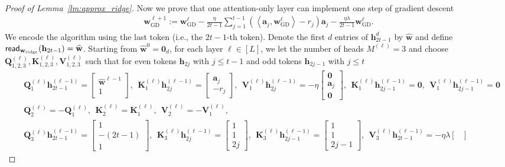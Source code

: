 \documentclass[10pt]{article}
\renewcommand{\hat}{\widehat}
\newcommand{\<}{\left\langle}
\renewcommand{\>}{\right\rangle}
\renewcommand{\bQ}{\mathbf{Q}}
\newcommand{\bzero}{{\mathbf 0}}
\renewcommand{\read}{{\sf read}}
\newcommand{\ridge}{{\rm ridge}}
\newcommand{\GD}{{\mathrm{GD}}}
\newcommand{\partd}{{d}}
\newcommand{\ssl}{{{\ell}}}
\def\bK{{\mathbf K}}
\def\bQ{{\mathbf Q}}
\def\bV{{\mathbf V}}
\def\ba{{\mathbf a}}
\def\bh{{\mathbf h}}
\def\bw{{\mathbf w}}
\begin{document}
\begin{proof}[Proof of Lemma~\ref{lm:approx_ridge}]
Now we prove that one  attention-only layer can implement one step of gradient descent
\begin{align*}
    \bw^{\ssl+1}_{\GD}:=\bw^{\ssl}_{\GD}- \frac{\eta}{2t-1}\sum_{j=1}^{t-1}(\<\ba_j,\bw^\ssl_{\GD}\>-r_j)\ba_j- \frac{\eta\lambda}{2t-1}\bw^\ssl_{\GD}.
\end{align*}
We encode the algorithm using the last token (i.e., the $2t-1$-th token).
Denote the first $d$ entries of $\bh_{2t-1}^{\partd}$ by $\hat\bw$ and  define $\read_{\bw_{\ridge}}(\bh_{2t-1})=\hat\bw$. Starting from $\hat\bw^{0}=\bzero_d$, for each layer $\ell\in[L]$, we let the number of heads $M^{(\ell)}=3$ and  choose $\bQ_{1,2,3}^{(\ell)},\bK_{1,2,3}^{(\ell)},\bV_{1,2,3}^{(\ell)}$ such that for even tokens $\bh_{2j}$ with $j\leq t-1$ and odd tokens $\bh_{2j-1}$ with $j\leq t$
\begin{align*}
    &\bQ_1^{(\ell)}\bh^{(\ell-1)}_{2t-1}=\begin{bmatrix}
        \hat\bw^{\ell-1}\\ 1
    \end{bmatrix},~~ \bK_1^{(\ell)}\bh^{(\ell-1)}_{2j}=\begin{bmatrix}
        \ba_j\\ -r_j
    \end{bmatrix},~~ \bV_1^{(\ell)}\bh^{(\ell-1)}_{2j}=-\eta\begin{bmatrix}
        \bzero\\ \ba_j \\ \bzero
    \end{bmatrix},~~
    \bK_1^{(\ell)}\bh^{(\ell-1)}_{2j-1}=\bzero, ~~\bV_1^{(\ell)}\bh^{(\ell-1)}_{2j-1}=\bzero
    \\
    &
    \bQ_2^{(\ell)}=-\bQ_1^{(\ell)},~~ \bK_2^{(\ell)}=\bK_1^{(\ell)},~~  \bV_2^{(\ell)}=-\bV_1^{(\ell)},\\
     &
     \bQ_3^{(\ell)}\bh^{(\ell-1)}_{2t-1}=\begin{bmatrix}
         1\\-(2t-1)\\ 1
    \end{bmatrix},~~ \bK_3^{(\ell)}\bh^{(\ell-1)}_{2j}=\begin{bmatrix}
        1\\ 1 \\2j
    \end{bmatrix},~~ \bK_3^{(\ell)}\bh^{(\ell-1)}_{2j-1}=\begin{bmatrix}
        1\\ 1 \\2j-1
    \end{bmatrix},~~ \bV_3^{(\ell)}\bh^{(\ell-1)}_{2t-1}=-\eta\lambda\begin{bmatrix}

\end{bmatrix}
\end{align*}
\end{proof}
\end{document}
